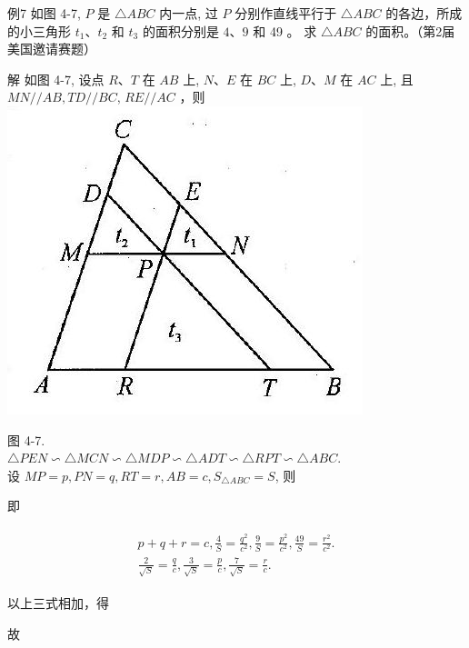 \documentclass[10pt]{article}
\begin{document}
例7 如图 4-7, $P$ 是 $\triangle A B C$ 内一点, 过 $P$ 分别作直线平行于 $\triangle A B C$ 的各边，所成的小三角形 $t_{1} 、 t_{2}$ 和 $t_{3}$ 的面积分别是 $4 、 9$ 和 49 。 求 $\triangle A B C$ 的面积。（第2届美国邀请赛题）

解 如图 4-7, 设点 $R 、 T$ 在 $A B$ 上, $N 、 E$ 在 $B C$ 上, $D 、 M$ 在 $A C$ 上, 且 $M N / / A B, T D / / B C$, $R E / / A C$ ，则\\
\includegraphics[max width=\textwidth, center]{2024_10_30_2c8f45efd4a519b08e1ag-040}

图 4-7.\\
$\triangle P E N \backsim \triangle M C N \backsim \triangle M D P \backsim \triangle A D T \backsim \triangle R P T \backsim \triangle A B C$.\\
设 $M P=p, P N=q, R T=r, A B=c, S_{\triangle A B C}=S$, 则

即

\begin{align*}
\begin{gathered}
p+q+r=c, \frac{4}{S}=\frac{q^{2}}{c^{2}}, \frac{9}{S}=\frac{p^{2}}{c^{2}}, \frac{49}{S}=\frac{r^{2}}{c^{2}} . \\
\frac{2}{\sqrt{S}}=\frac{q}{c}, \frac{3}{\sqrt{S}}=\frac{p}{c}, \frac{7}{\sqrt{S}}=\frac{r}{c} .
\end{gathered}
\end{align*}

以上三式相加，得

故
\end{document}
